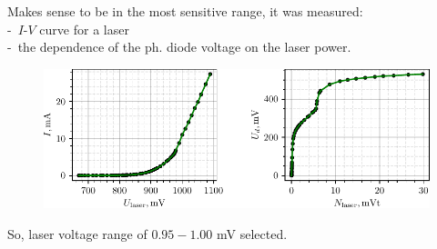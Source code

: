 
Makes sense to be in the most sensitive range, it was measured: \\
 -\ $I$-$V$ curve  for a laser \\
 -\ the dependence of the ph. diode voltage on the laser power.

\begin{figure}[h]
    \includegraphics[width=1.0\textwidth]{figures/IV.pdf}
\end{figure}

So, laser voltage range of  $0.95-1.00$ mV selected.